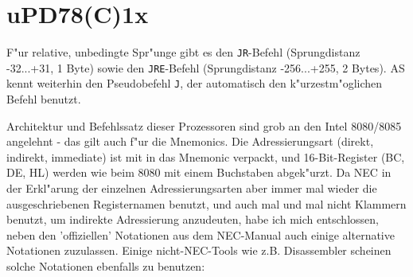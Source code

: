 \documentclass[12pt,a4paper,twoside]{report}
\newcommand{\tty}[1]{{\tt #1}}
\begin{document}

\section{uPD78(C)1x}
\label{78C1xSpec}

F"ur relative, unbedingte Spr"unge gibt es den \tty{JR}-Befehl (Sprungdistanz
-32...+31, 1 Byte) sowie den \tty{JRE}-Befehl (Sprungdistanz -256...+255, 2
Bytes).  AS kennt weiterhin den Pseudobefehl \tty{J}, der automatisch den
k"urzestm"oglichen Befehl benutzt.

Architektur und Befehlssatz dieser Prozessoren sind grob an den
Intel 8080/8085 angelehnt - das gilt auch f"ur die Mnemonics.  Die
Adressierungsart (direkt, indirekt, immediate) ist mit in das
Mnemonic verpackt, und 16-Bit-Register (BC, DE, HL) werden wie
beim 8080 mit einem Buchstaben abgek"urzt.  Da NEC in der
Erkl"arung der einzelnen Adressierungsarten aber immer mal
wieder die ausgeschriebenen Registernamen benutzt, und auch mal
und mal nicht Klammern benutzt, um indirekte Adressierung anzudeuten,
habe ich mich entschlossen, neben den 'offiziellen'
Notationen aus dem NEC-Manual auch einige alternative Notationen
zuzulassen.  Einige nicht-NEC-Tools wie z.B. Disassembler
scheinen solche Notationen ebenfalls zu benutzen:
\end{document}
